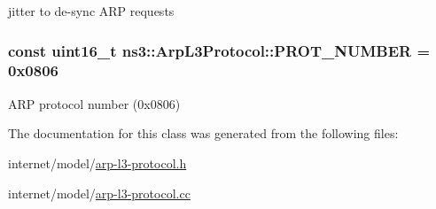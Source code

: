 jitter to de-\/sync A\+RP requests 

\subsubsection[{\texorpdfstring{P\+R\+O\+T\+\_\+\+N\+U\+M\+B\+ER}{PROT_NUMBER}}]{\setlength{\rightskip}{0pt plus 5cm}const uint16\+\_\+t ns3\+::\+Arp\+L3\+Protocol\+::\+P\+R\+O\+T\+\_\+\+N\+U\+M\+B\+ER = 0x0806\hspace{0.3cm}{\ttfamily [static]}}\hypertarget{classns3_1_1ArpL3Protocol_a836aec5bc5e5a8ea1d7f46609dc9cc2c}{}\label{classns3_1_1ArpL3Protocol_a836aec5bc5e5a8ea1d7f46609dc9cc2c}


A\+RP protocol number (0x0806) 



The documentation for this class was generated from the following files\+:\begin{DoxyCompactItemize}
\item 
internet/model/\hyperlink{arp-l3-protocol_8h}{arp-\/l3-\/protocol.\+h}\item 
internet/model/\hyperlink{arp-l3-protocol_8cc}{arp-\/l3-\/protocol.\+cc}\end{DoxyCompactItemize}
